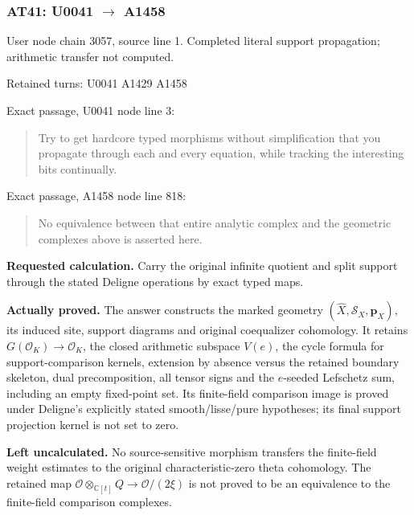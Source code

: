 \subsubsection{\texorpdfstring{AT41: U0041
\allowbreak{}\ensuremath{→}\allowbreak{}
A1458}{AT41: U0041  A1458}}\label{at41-u0041-a1458}

User node \protect{} chain
3057, source line 1. Completed literal support propagation; arithmetic
transfer not computed.

Retained turns: U0041
\protect{} A1429
\protect{} A1458
\protect{}

Exact passage, U0041 node
\protect{} line 3:

\begin{quote}
Try to get hardcore typed morphisms without simplification that you
propagate through each and every equation, while tracking the
interesting bits continually.
\end{quote}

Exact passage, A1458 node
\protect{} line 818:

\begin{quote}
No equivalence between that entire analytic complex and the geometric
complexes above is asserted here.
\end{quote}

\textbf{Requested calculation.} Carry the original infinite quotient and
split support through the stated Deligne operations by exact typed maps.

\textbf{Actually proved.} The answer constructs the marked geometry
\((\widehat X,\mathcal S_X,\mathbf p_X)\), its induced site, support
diagrams and original coequalizer cohomology. It retains
\(G(\mathcal O_K)\to\mathcal O_K\), the closed arithmetic subspace
\(V(e)\), the cycle formula for support-comparison kernels, extension by
absence versus the retained boundary skeleton, dual precomposition, all
tensor signs and the \(e\)-seeded Lefschetz sum, including an empty
fixed-point set. Its finite-field comparison image is proved under
Deligne's explicitly stated smooth/lisse/pure hypotheses; its final
support projection kernel is not set to zero.

\textbf{Left uncalculated.} No source-sensitive morphism transfers the
finite-field weight estimates to the original characteristic-zero theta
cohomology. The retained map
\(\mathcal O\otimes_{\mathbb C[t]}Q\to\mathcal O/(2\xi)\) is not proved
to be an equivalence to the finite-field comparison complexes.

